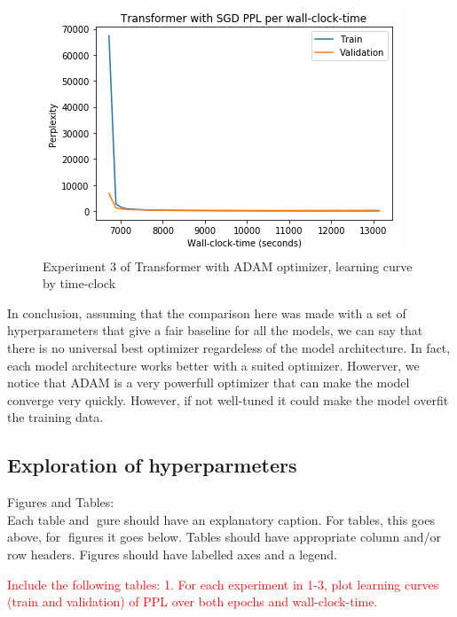 \begin{itemize}
\begin{figure}[H]
	\centering
	\includegraphics[scale=0.8]{Q4-2_TR_SGD_clock.png}
	\caption{Experiment 3 of Transformer with ADAM optimizer, learning curve by time-clock}
	\label{fig:fig18}
\end{figure}

\end{itemize}
%
In conclusion, assuming that the comparison here was made with a set of hyperparameters that give a fair baseline for all the models, we can say that there is no universal best optimizer regardeless of the model architecture. In fact, each model architecture works better with a suited optimizer. Howerver, we notice that ADAM is a very powerfull optimizer that can make the model converge very quickly. However, if not well-tuned it could make the model overfit the training data. \\




\subsection{Exploration of hyperparmeters}

Figures and Tables:\\
Each table and gure should have an explanatory caption. 
For tables, this goes above, for figures it goes below. 
Tables should have appropriate column and/or row headers.
Figures should have labelled axes and a legend. 

\textcolor{red}{Include the following tables:
1. For each experiment in 1-3, plot learning curves (train and validation) of PPL over both
epochs and wall-clock-time.}

